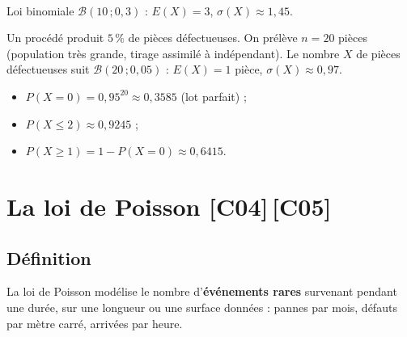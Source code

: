 \documentclass[a4paper,11pt]{article}
\begin{document}
\begin{center}
\\
{\footnotesize\color{uimmgray} Loi binomiale $\mathcal{B}(10\,;0{,}3)$ : $E(X) = 3$, $\sigma(X) \approx 1{,}45$.}
\end{center}

\begin{appliindus}
Un procédé produit $5\,\%$ de pièces défectueuses. On prélève $n = 20$ pièces (population très grande, tirage assimilé à indépendant). Le nombre $X$ de pièces défectueuses suit $\mathcal{B}(20\,;0{,}05)$ : $E(X) = 1$ pièce, $\sigma(X) \approx 0{,}97$.
\begin{itemize}
  \item $P(X = 0) = 0{,}95^{20} \approx 0{,}3585$ (lot parfait) ;
  \item $P(X \leq 2) \approx 0{,}9245$ ;
  \item $P(X \geq 1) = 1 - P(X = 0) \approx 0{,}6415$.
\end{itemize}
\end{appliindus}

\newpage
\section{La loi de Poisson \hfill {\normalsize\color{uimmred}[C04]\,[C05]}}

\subsection{Définition}

La loi de Poisson modélise le nombre d'\textbf{événements rares} survenant pendant une durée, sur une longueur ou une surface données : pannes par mois, défauts par mètre carré, arrivées par heure.
\end{document}
